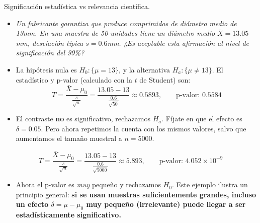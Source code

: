 \documentclass[
  9pt,
  ignorenonframetext,
]{beamer}
\providecommand{\tightlist}{%
  \setlength{\itemsep}{0pt}\setlength{\parskip}{0pt}}
\begin{document}
\begin{frame}{Significación estadística vs relevancia científica.}
\protect\hypertarget{significacion-estadistica-vs-relevancia-cientifica.}{}

\begin{itemize}
\item
  \emph{Un fabricante garantiza que produce comprimidos de diámetro
  medio de 13mm. En una muestra de 50 unidades tiene un diámetro medio
  \(\bar X =13.05\)mm, desviación típica \(s = 0.6\)mm. ¿Es aceptable
  esta afirmación al nivel de significación del 99\%?}
\item
  La hipótesis nula es \(H_0:\{\mu = 13\}\), y la alternativa
  \(H_a:\{\mu\neq 13\}\). El estadístico y p-valor (calculado con la
  \(t\) de Student) son: \[
  T = \dfrac{\bar X - \mu_0}{\frac{s}{\sqrt{n}}} =
  \dfrac{13.05 - 13}{\frac{0.6}{\sqrt{50}}}\approx
  0.5893,\qquad
  \text{p-valor: }
  0.5584
  \]
\item
  El contraste \textbf{no} es significativo, rechazamos \(H_a\). Fíjate
  en que el efecto es \(\delta = 0.05\). Pero ahora repetimos la cuenta
  con los mismos valores, salvo que aumentamos el tamaño muestral a
  \(n = 5000\).
\end{itemize}

\[
T = \dfrac{\bar X - \mu_0}{\frac{s}{\sqrt{n}}} =
\dfrac{13.05 - 13}{\frac{0.6}{\sqrt{5000}}}\approx
5.893,\qquad
\text{p-valor: }
\ensuremath{4.052\times 10^{-9}}
\]

\begin{itemize}
\tightlist
\item
  Ahora el p-valor es \emph{muy} pequeño y rechazamos \(H_0\). Este
  ejemplo ilustra un principio general: \textbf{si se usan muestras
  suficientemente grandes, incluso un efecto \(\delta = \mu - \mu_0\)
  muy pequeño (irrelevante) puede llegar a ser estadísticamente
  significativo.}
\end{itemize}

\end{frame}
\end{document}
